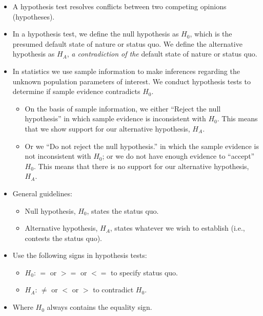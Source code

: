 \documentclass[
  letterpaper,
  DIV=11,
  numbers=noendperiod]{scrreprt}
\providecommand{\tightlist}{%
  \setlength{\itemsep}{0pt}\setlength{\parskip}{0pt}}\usepackage{longtable,booktabs,array}
\begin{document}
\begin{itemize}
\tightlist
\item
  A hypothesis test resolves conflicts between two competing opinions
  (hypotheses).
\item
  In a hypothesis test, we define the null hypothesis as \(H_0\), which
  is the presumed default state of nature or status quo. We define the
  alternative hypothesis as \(H_A\), \emph{a contradiction of the}
  default state of nature or status quo.
\item
  In statistics we use sample information to make inferences regarding
  the unknown population parameters of interest. We conduct hypothesis
  tests to determine if sample evidence contradicts \(H_0\).

  \begin{itemize}
  \tightlist
  \item
    On the basis of sample information, we either ``Reject the null
    hypothesis'' in which sample evidence is inconsistent with \(H_0\).
    This means that we show support for our alternative hypothesis,
    \(H_A\).
  \item
    Or we ``Do not reject the null hypothesis.'' in which the sample
    evidence is not inconsistent with \(H_0\); or we do not have enough
    evidence to ``accept'' \(H_0\). This means that there is no support
    for our alternative hypothesis, \(H_A\).
  \end{itemize}
\item
  General guidelines:

  \begin{itemize}
  \tightlist
  \item
    Null hypothesis, \(H_0\), states the status quo.
  \item
    Alternative hypothesis, \(H_A\), states whatever we wish to
    establish (i.e., contests the status quo).
  \end{itemize}
\item
  Use the following signs in hypothesis tests:

  \begin{itemize}
  \tightlist
  \item
    \(H_0\): \(=\) or \(>=\) or \(<=\) to specify status quo.
  \item
    \(H_A\): \(\neq\) or \(<\) or \(>\) to contradict \(H_0\).
  \end{itemize}
\item
  Where \(H_0\) always contains the equality sign.
\end{itemize}
\end{document}
